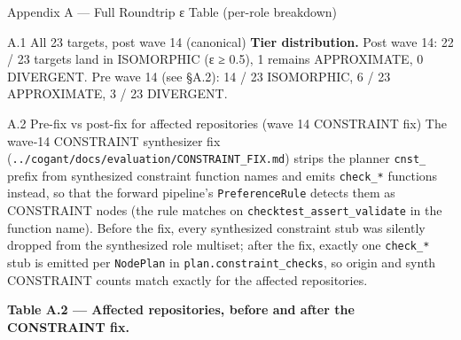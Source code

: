 \documentclass[
  ignorenonframetext,
]{beamer}
\begin{document}
\begin{frame}[fragile]{Appendix A --- Full Roundtrip ε Table (per-role
breakdown)}
\begin{block}{A.1 All 23 targets, post wave 14 (canonical)}
\textbf{Tier distribution.} Post wave 14: 22 / 23 targets land in
ISOMORPHIC (ε ≥ 0.5), 1 remains APPROXIMATE, 0 DIVERGENT. Pre wave 14
(see §A.2): 14 / 23 ISOMORPHIC, 6 / 23 APPROXIMATE, 3 / 23 DIVERGENT.
\end{block}

\begin{block}{A.2 Pre-fix vs post-fix for affected repositories (wave 14
CONSTRAINT fix)}
\protect{}\label{a.2-pre-fix-vs-post-fix-for-affected-repositories-wave-14-constraint-fix}
The wave‑14 CONSTRAINT synthesizer fix
(\texttt{../cogant/docs/evaluation/CONSTRAINT\_FIX.md}) strips the
planner \texttt{cnst\_} prefix from synthesized constraint function
names and emits \texttt{check\_*} functions instead, so that the forward
pipeline's \texttt{PreferenceRule} detects them as CONSTRAINT nodes (the
rule matches on
\texttt{check\textbar{}test\_\textbar{}assert\_\textbar{}validate} in
the function name). Before the fix, every synthesized constraint stub
was silently dropped from the synthesized role multiset; after the fix,
exactly one \texttt{check\_*} stub is emitted per \texttt{NodePlan} in
\texttt{plan.constraint\_checks}, so origin and synth CONSTRAINT counts
match exactly for the affected repositories.

\textbf{Table A.2 --- Affected repositories, before and after the
CONSTRAINT fix.}


\end{block}
\end{frame}
\end{document}
